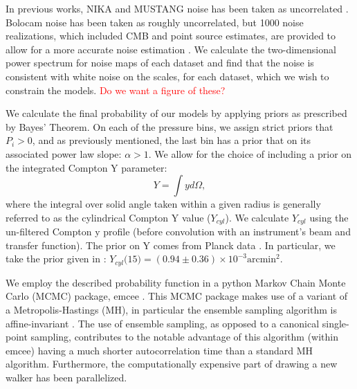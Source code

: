 \documentclass[iop,numberedappendix,apj]{emulateapj}
\begin{document}
In previous works, NIKA and MUSTANG noise has been taken as uncorrelated \citep[e.g.][]{romero2015a,romero2016,adam2015}.
Bolocam noise has been taken as roughly uncorrelated, but 1000 noise realizations, which included CMB and point
source estimates, are provided to allow for a more accurate noise estimation \citep{sayers2011}.
We calculate the two-dimensional power spectrum for noise maps of each dataset and find that the noise is consistent
with white noise on the scales, for each dataset, which we wish to constrain the models.
\textcolor{red}{Do we want a figure of these?}

We calculate the final probability of our models by applying priors as prescribed by Bayes' Theorem.
On each of the pressure bins, we assign strict priors that $P_i > 0$, and as previously mentioned, the last bin
has a prior that on its associated power law slope: $\alpha > 1$. We allow for the choice of including a prior
on the integrated Compton Y parameter:
\begin{equation}
  Y = \int y d\Omega,
  \label{eqn:integrated_y}
\end{equation}
where the integral over solid angle taken within a given radius is generally referred to as the cylindrical
Compton Y value ($Y_{cyl}$). We calculate $Y_{cyl}$ using the un-filtered Compton y profile (before convolution with
an instrument's beam and transfer function). The prior on Y comes
from Planck data \citep{planck2014}. In particular, we take the prior given in \citet{adam2015}:
$Y_{cyl}(15$\amin$) = (0.94 \pm 0.36) \times 10^{-3} \text{arcmin}^2$.

We employ the described probability function in a python Markov Chain Monte Carlo (MCMC) package, emcee \citep{foreman2013}.
This MCMC package makes use of a variant of a Metropolis-Hastings (MH), in particular the ensemble sampling algorithm is
affine-invariant \citep{goodman2010}. The use of ensemble sampling, as opposed to a canonical single-point sampling, contributes
to the notable advantage of this algorithm (within emcee) having a much shorter autocorrelation time than a standard MH algorithm.
Furthermore, the computationally expensive part of drawing a new walker has been parallelized.
\end{document}
